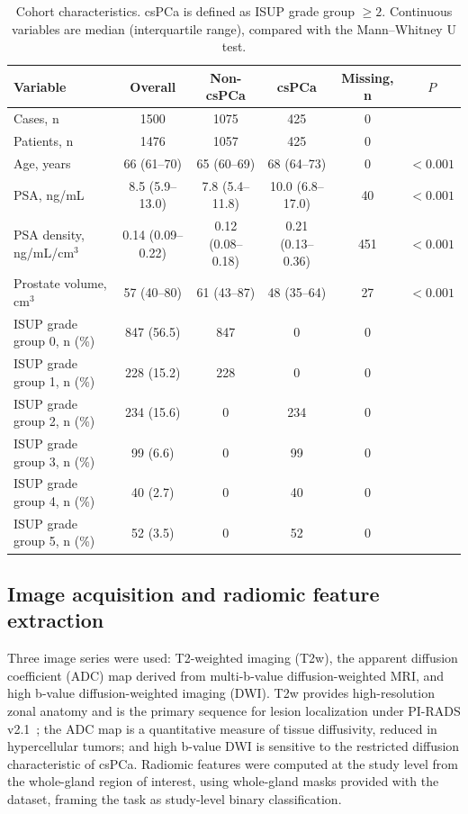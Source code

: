 \documentclass[11pt]{article}
\begin{document}
\begin{table}[htbp]
\centering
\caption{Cohort characteristics. csPCa is defined as ISUP grade group $\geq 2$.
Continuous variables are median (interquartile range), compared with the
Mann--Whitney U test.}
\label{tab:cohort}
\begin{tabular}{lccccc}
\toprule
Variable & Overall & Non-csPCa & csPCa & Missing, n & $P$ \\
\midrule
Cases, n & 1500 & 1075 & 425 & 0 & \\
Patients, n & 1476 & 1057 & 425 & 0 & \\
Age, years & 66 (61--70) & 65 (60--69) & 68 (64--73) & 0 & $<0.001$ \\
PSA, ng/mL & 8.5 (5.9--13.0) & 7.8 (5.4--11.8) & 10.0 (6.8--17.0) & 40 & $<0.001$ \\
PSA density, ng/mL/cm$^3$ & 0.14 (0.09--0.22) & 0.12 (0.08--0.18) & 0.21 (0.13--0.36) & 451 & $<0.001$ \\
Prostate volume, cm$^3$ & 57 (40--80) & 61 (43--87) & 48 (35--64) & 27 & $<0.001$ \\
\midrule
ISUP grade group 0, n (\%) & 847 (56.5) & 847 & 0 & 0 & \\
ISUP grade group 1, n (\%) & 228 (15.2) & 228 & 0 & 0 & \\
ISUP grade group 2, n (\%) & 234 (15.6) & 0 & 234 & 0 & \\
ISUP grade group 3, n (\%) & 99 (6.6) & 0 & 99 & 0 & \\
ISUP grade group 4, n (\%) & 40 (2.7) & 0 & 40 & 0 & \\
ISUP grade group 5, n (\%) & 52 (3.5) & 0 & 52 & 0 & \\
\bottomrule
\end{tabular}
\end{table}

\subsection{Image acquisition and radiomic feature extraction}
\label{sec:extraction}

Three image series were used: T2-weighted imaging (T2w), the apparent diffusion
coefficient (ADC) map derived from multi-b-value diffusion-weighted MRI, and
high b-value diffusion-weighted imaging (DWI). T2w
provides high-resolution zonal anatomy and is the primary sequence for lesion
localization under PI-RADS v2.1~\citep{turkbey2019pirads}; the ADC map is a
quantitative measure of tissue diffusivity, reduced in hypercellular tumors; and
high b-value DWI is sensitive to the restricted diffusion characteristic of
csPCa. Radiomic features were computed at the study level from the whole-gland
region of interest, using whole-gland masks provided with the dataset, framing
the task as study-level binary classification.
\end{document}
